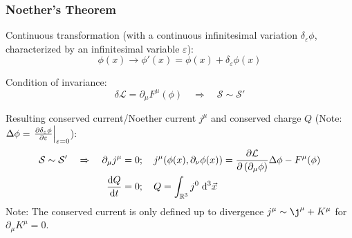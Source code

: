 		\subsubsection{Noether's Theorem}
			\noindent
			Continuous transformation (with a continuous infinitesimal variation $\delta_\varepsilon \phi$, characterized by an infinitesimal variable $\varepsilon$):
			\begin{equation}
				\phi(x)\rightarrow\phi'(x) = \phi(x) + \delta_\varepsilon \phi(x)
			\end{equation}
			
			\noindent
			Condition of invariance:
			\begin{equation}
				\delta\mathcal{L} = \partial_\mu F^\mu(\phi) 
				\quad \Rightarrow \quad \mathcal{S} \sim \mathcal{S}'
			\end{equation}

			\noindent
			Resulting conserved current/Noether current $j^{\mu}$ and conserved charge $Q$ (Note: $\Delta \phi = \eval{\pdv{\delta_\varepsilon \phi}{\varepsilon}}_{\varepsilon=0}$):
			\begin{equation}
				\begin{aligned}
					\mathcal{S} \sim \mathcal{S}' \quad\Rightarrow\quad 
					\partial_\mu j^\mu &= 0;\quad
					j^\mu \qty( \phi(x), \partial_\nu\phi(x) ) = \pdv{\mathcal{L}}{\left(\partial_\mu \phi\right)}\Delta\phi - F^\mu(\phi) \\
					\dv{Q}{t} &= 0; \quad Q = \int_{\mathbb{R}^3} j^0\;\dd^3\vec{x} \\
				\end{aligned}
			\end{equation}
			Note: The conserved current is only defined up to divergence $j^\mu \sim \j^\mu + K^\mu$ for $\partial_\mu K^\mu = 0$.